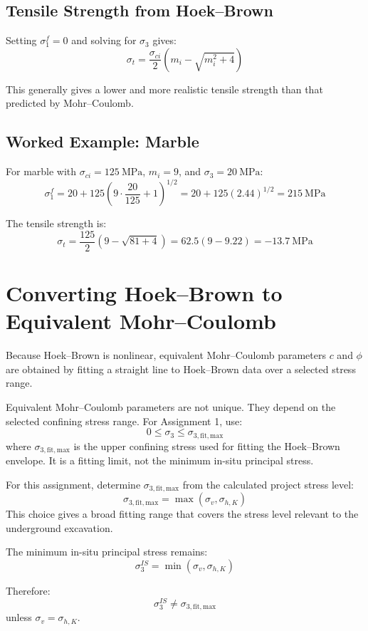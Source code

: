 \documentclass[a4paper,12pt]{article}
\begin{document}
\subsection{Tensile Strength from Hoek--Brown}

Setting \(\sigma_1^f = 0\) and solving for \(\sigma_3\) gives:
\[
\sigma_t =
\frac{\sigma_{ci}}{2}
\left(
m_i - \sqrt{m_i^2+4}
\right)
\]

This generally gives a lower and more realistic tensile strength than that predicted by
Mohr--Coulomb.

\subsection{Worked Example: Marble}

For marble with \(\sigma_{ci}=125~\text{MPa}\), \(m_i=9\), and \(\sigma_3=20~\text{MPa}\):
\[
\sigma_1^f =
20 + 125
\left(
9\cdot\frac{20}{125}+1
\right)^{1/2}
=
20 + 125(2.44)^{1/2}
=
215~\text{MPa}
\]

The tensile strength is:
\[
\sigma_t =
\frac{125}{2}
\left(
9-\sqrt{81+4}
\right)
=
62.5(9-9.22)
=
-13.7~\text{MPa}
\]

\section{Converting Hoek--Brown to Equivalent Mohr--Coulomb}

Because Hoek--Brown is nonlinear, equivalent Mohr--Coulomb parameters \(c\) and
\(\phi\) are obtained by fitting a straight line to Hoek--Brown data over a selected
stress range.

\begin{warnbox}
Equivalent Mohr--Coulomb parameters are not unique. They depend on the selected
confining stress range. For Assignment 1, use:
\[
0 \leq \sigma_3 \leq \sigma_{3,\mathrm{fit,max}}
\]
where \(\sigma_{3,\mathrm{fit,max}}\) is the upper confining stress used for fitting the
Hoek--Brown envelope. It is a fitting limit, not the minimum in-situ principal stress.
\end{warnbox}

\begin{notebox}
For this assignment, determine \(\sigma_{3,\mathrm{fit,max}}\) from the calculated project
stress level:
\[
\sigma_{3,\mathrm{fit,max}}=\max(\sigma_v,\sigma_{h,K})
\]
This choice gives a broad fitting range that covers the stress level relevant to the
underground excavation.

The minimum in-situ principal stress remains:
\[
\sigma_3^{IS}=\min(\sigma_v,\sigma_{h,K})
\]

Therefore:
\[
\sigma_3^{IS} \neq \sigma_{3,\mathrm{fit,max}}
\]
unless \(\sigma_v=\sigma_{h,K}\).
\end{notebox}
\end{document}
